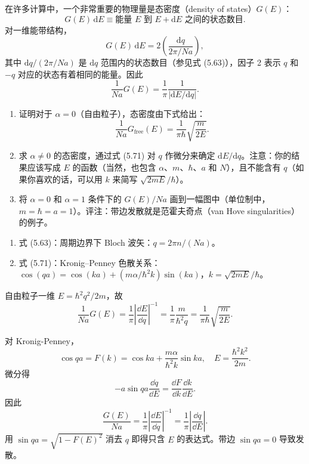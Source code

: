 \begin{question}
在许多计算中，一个非常重要的物理量是态密度（density of states）$G(E)$：
\[
G(E)\,\mathrm dE\equiv \text{能量 }E\text{ 到 }E+\mathrm dE\text{ 之间的状态数目}.
\]
对一维能带结构，
\[
G(E)\,\mathrm dE=2\left(\frac{\mathrm dq}{2\pi/Na}\right),
\]
其中 $\mathrm dq/(2\pi/Na)$ 是 $\mathrm dq$ 范围内的状态数目（参见式 (5.63)），因子 2 表示 $q$ 和 $-q$ 对应的状态有着相同的能量。因此
\[
\frac{1}{Na}G(E)=\frac{1}{\pi}\frac{1}{|\mathrm dE/\mathrm dq|}.
\]
\begin{enumerate}
\item 证明对于 $\alpha=0$（自由粒子），态密度由下式给出：
\[
\frac{1}{Na}G_{\mathrm{free}}(E)=\frac{1}{\pi\hbar}\sqrt{\frac{m}{2E}}.
\]
\item 求 $\alpha\ne0$ 的态密度，通过式 (5.71) 对 $q$ 作微分来确定 $\mathrm dE/\mathrm dq$。注意：你的结果应该写成 $E$ 的函数（当然，也包含 $\alpha$、$m$、$\hbar$、$a$ 和 $N$），且不能含有 $q$（如果你喜欢的话，可以用 $k$ 来简写 $\sqrt{2mE}/\hbar$）。
\item 将 $\alpha=0$ 和 $\alpha=1$ 条件下的 $G(E)/Na$ 画到一幅图中（单位制中，$m=\hbar=a=1$）。评注：带边发散就是范霍夫奇点（van Hove singularities）的例子。
\end{enumerate}

\par\smallskip
{}
\begin{enumerate}[leftmargin=2.2em,itemsep=0.12em,topsep=0.12em,parsep=0pt]
\item 式 (5.63)：周期边界下 Bloch 波矢：$q=2\pi n/(Na)$。
\item 式 (5.71)：Kronig--Penney 色散关系：$\cos(qa)=\cos(ka)+(m\alpha/\hbar^2k)\sin(ka)$，$k=\sqrt{2mE}/\hbar$。
\end{enumerate}

\end{question}
\begin{solution}

自由粒子一维 $E=\hbar^2q^2/2m$，故
\[
\frac{1}{Na}G(E)=\frac1\pi\left|\frac{\dd E}{\dd q}\right|^{-1}
=\frac1\pi\frac{m}{\hbar^2q}
=\frac{1}{\pi\hbar}\sqrt{\frac{m}{2E}}.
\]

对 Kronig-Penney，
\[
\cos qa=F(k)=\cos ka+\frac{m\alpha}{\hbar^2k}\sin ka,
\quad E=\frac{\hbar^2k^2}{2m}.
\]
微分得
\[
-a\sin qa\frac{\dd q}{\dd E}=\frac{\dd F}{\dd k}\frac{\dd k}{\dd E}.
\]
因此
\[
\frac{G(E)}{Na}=\frac1\pi\left|\frac{\dd E}{\dd q}\right|^{-1}
=\frac1\pi\left|\frac{\dd q}{\dd E}\right|.
\]
用 $\sin qa=\sqrt{1-F(E)^2}$ 消去 $q$ 即得只含 $E$ 的表达式。带边 $\sin qa=0$ 导致发散。

\end{solution}

